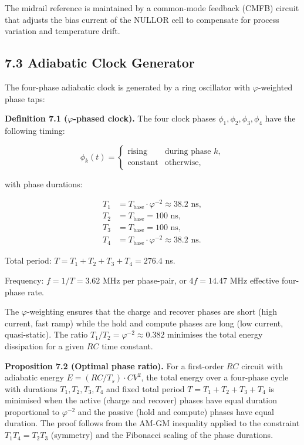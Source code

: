 The midrail reference is maintained by a common-mode feedback (CMFB)
circuit that adjusts the bias current of the NULLOR cell to compensate
for process variation and temperature drift.

\subsection{7.3 Adiabatic Clock Generator}

The four-phase adiabatic clock is generated by a ring oscillator with
\(\varphi\)-weighted phase taps:

\textbf{Definition 7.1 (\(\varphi\)-phased clock).} The four clock
phases \(\phi_1, \phi_2, \phi_3, \phi_4\) have the following timing:

\[
\phi_k(t) = \begin{cases}
\text{rising} & \text{during phase } k, \\
\text{constant} & \text{otherwise},
\end{cases}
\]

with phase durations:

\begin{align*}
T_1 &= T_{\text{base}} \cdot \varphi^{-2} \approx 38.2 \text{ ns}, \\
T_2 &= T_{\text{base}} = 100 \text{ ns}, \\
T_3 &= T_{\text{base}} = 100 \text{ ns}, \\
T_4 &= T_{\text{base}} \cdot \varphi^{-2} \approx 38.2 \text{ ns}.
\end{align*}

Total period: \(T = T_1 + T_2 + T_3 + T_4 = 276.4\) ns.

Frequency: \(f = 1/T = 3.62\) MHz per phase-pair, or
\(4f = 14.47\) MHz effective four-phase rate.

The \(\varphi\)-weighting ensures that the charge and recover phases
are short (high current, fast ramp) while the hold and compute phases
are long (low current, quasi-static). The ratio
\(T_1/T_2 = \varphi^{-2} \approx 0.382\) minimises the total energy
dissipation for a given \(RC\) time constant.

\textbf{Proposition 7.2 (Optimal phase ratio).} For a first-order
\(RC\) circuit with adiabatic energy
\(E = (RC/T_s) \cdot CV^2\), the total energy over a four-phase
cycle with durations \(T_1, T_2, T_3, T_4\) and fixed total period
\(T = T_1 + T_2 + T_3 + T_4\) is minimised when the active (charge
and recover) phases have equal duration proportional to
\(\varphi^{-2}\) and the passive (hold and compute) phases have equal
duration. The proof follows from the AM-GM inequality applied to the
constraint \(T_1 T_4 = T_2 T_3\) (symmetry) and the Fibonacci
scaling of the phase durations.

